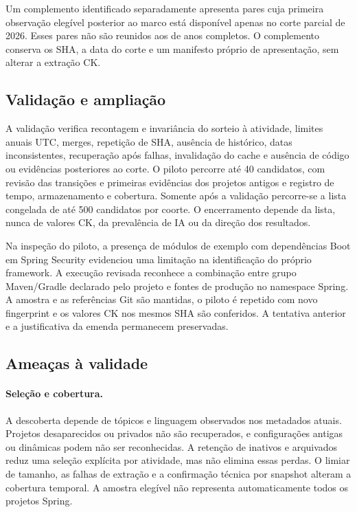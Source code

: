 Um complemento identificado separadamente apresenta pares cuja primeira observação elegível posterior ao marco está disponível apenas no corte parcial de 2026. Esses pares não são reunidos aos de anos completos. O complemento conserva os SHA, a data do corte e um manifesto próprio de apresentação, sem alterar a extração CK.

\subsection{Validação e ampliação}
\label{subsec:validacao-historica}

A validação verifica recontagem e invariância do sorteio à atividade, limites anuais UTC, merges, repetição de SHA, ausência de histórico, datas inconsistentes, recuperação após falhas, invalidação do cache e ausência de código ou evidências posteriores ao corte. O piloto percorre até 40 candidatos, com revisão das transições e primeiras evidências dos projetos antigos e registro de tempo, armazenamento e cobertura. Somente após a validação percorre-se a lista congelada de até 500 candidatos por coorte. O encerramento depende da lista, nunca de valores CK, da prevalência de IA ou da direção dos resultados.

Na inspeção do piloto, a presença de módulos de exemplo com dependências Boot em Spring Security evidenciou uma limitação na identificação do próprio framework. A execução revisada reconhece a combinação entre grupo Maven/Gradle declarado pelo projeto e fontes de produção no namespace Spring. A amostra e as referências Git são mantidas, o piloto é repetido com novo fingerprint e os valores CK nos mesmos SHA são conferidos. A tentativa anterior e a justificativa da emenda permanecem preservadas.

\subsection{Ameaças à validade}

\paragraph{Seleção e cobertura.}
A descoberta depende de tópicos e linguagem observados nos metadados atuais. Projetos desaparecidos ou privados não são recuperados, e configurações antigas ou dinâmicas podem não ser reconhecidas. A retenção de inativos e arquivados reduz uma seleção explícita por atividade, mas não elimina essas perdas. O limiar de tamanho, as falhas de extração e a confirmação técnica por snapshot alteram a cobertura temporal. A amostra elegível não representa automaticamente todos os projetos Spring.

